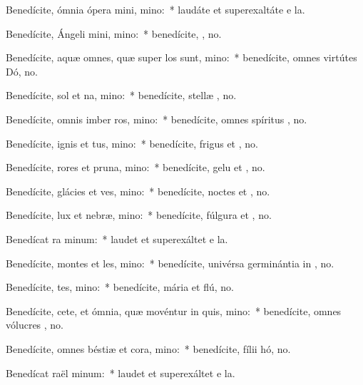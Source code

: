 \item Benedícite, ómnia ópera mini, mino:~* laudáte et superexaltáte e  la.
\item Benedícite, Ángeli mini, mino:~* benedícite, , no.
\item Benedícite, aquæ omnes, quæ super los sunt, mino:~* benedícite, omnes virtútes Dó, no.
\item Benedícite, sol et na, mino:~* benedícite, stellæ , no.
\item Benedícite, omnis imber  ros, mino:~* benedícite, omnes spíritus , no.
\item Benedícite, ignis et tus, mino:~* benedícite, frigus et , no.
\item Benedícite, rores et pruna, mino:~* benedícite, gelu et , no.
\item Benedícite, glácies et ves, mino:~* benedícite, noctes et , no.
\item Benedícite, lux et nebræ, mino:~* benedícite, fúlgura et , no.
\item Benedícat ra minum:~* laudet et superexáltet e  la.
\item Benedícite, montes et les, mino:~* benedícite, univérsa germinántia in , no.
\item Benedícite, tes, mino:~* benedícite, mária et flú, no.
\item Benedícite, cete, et ómnia, quæ movéntur in quis, mino:~* benedícite, omnes vólucres , no.
\item Benedícite, omnes béstiæ et cora, mino:~* benedícite, fílii hó, no.
\item Benedícat raël minum:~* laudet et superexáltet e  la.
